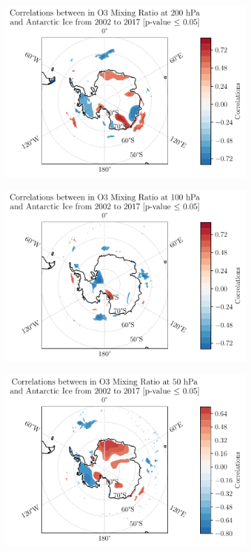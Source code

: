 \documentclass[../main.tex]{subfiles}
\begin{document}
\begin{figure}[hbt!]
\begin{subfigure}[b]{0.45\textwidth}
    \includegraphics[width=\textwidth]{images/2021w5/chapter7/hres/correlation_spatial_o3_200}
    \end{subfigure}
    \begin{subfigure}[b]{0.45\textwidth}
    \includegraphics[width=\textwidth]{images/2021w5/chapter7/hres/correlation_spatial_o3_100}
    \end{subfigure}
    \begin{subfigure}[b]{0.45\textwidth}
    \includegraphics[width=\textwidth]{images/2021w5/chapter7/hres/correlation_spatial_o3_50}

\end{subfigure}
\end{figure}
\end{document}
